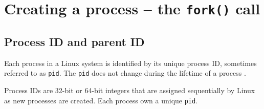 \documentclass[a4paper]{article}
\begin{document}






\newpage
\tableofcontents
\newpage



\section{Creating a process -- the \texttt{fork()} call}

\subsection{Process ID and parent ID}

\begin{definition}[pid]
Each process in a Linux system is identified by its unique process ID, sometimes
referred to as \textup{\texttt{pid}}. The \textup{\texttt{pid}} does not change during the lifetime of a process \cite{bookmitchell}.
\end{definition}
Process IDs are 32-bit or 64-bit integers that are assigned sequentially by Linux as new processes are created. Each process own a unique \texttt{pid}.
\end{document}
